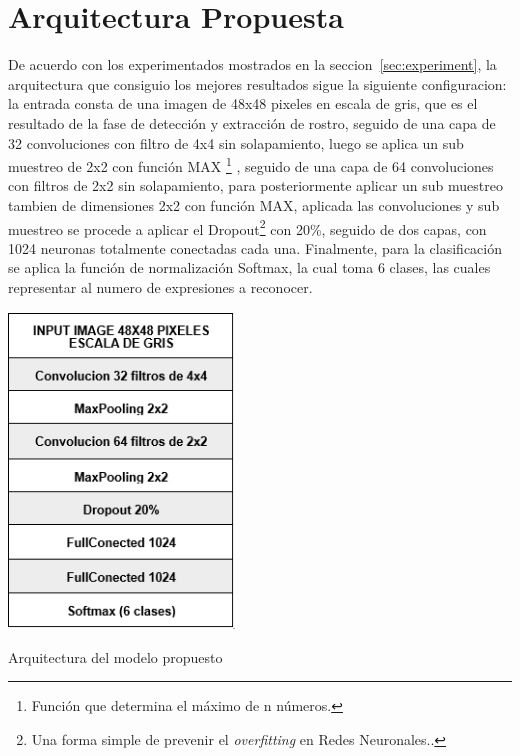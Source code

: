 \section{Arquitectura Propuesta}
\label{sec:arq_propuesta}
De acuerdo con los experimentados mostrados en la seccion~\ref{sec:experiment}, la arquitectura que consiguio los mejores resultados sigue la siguiente configuracion: la entrada consta de una imagen de 48x48 pixeles en escala de gris, que es el resultado de la fase de detección y extracción de rostro, seguido de una capa de 32 convoluciones con filtro de 4x4 sin solapamiento, luego se aplica un sub muestreo de 2x2 con función MAX \footnote[6]{Función que determina el máximo de n números.} , seguido de una capa de 64 convoluciones con filtros de 2x2 sin solapamiento, para posteriormente aplicar un sub muestreo tambien de dimensiones 2x2 con función MAX, aplicada las convoluciones y sub muestreo se procede a aplicar el Dropout\footnote[7]{Una forma simple de prevenir el \textit{overfitting} en Redes Neuronales..} con 20\%, seguido de dos capas, con 1024 neuronas totalmente conectadas cada una. Finalmente, para la clasificación se aplica la función de normalización Softmax, la cual toma 6 clases, las cuales representar al numero de expresiones a reconocer.
\vspace{0.5cm}
\begin{table}[H]
    \centering
    \includegraphics[width=60mm]{./Imagenes/tabla_arquitectura.png}
    \caption{Arquitectura del modelo propuesto}
    \label{tab:tabla_arquitectura}
\end{table}


